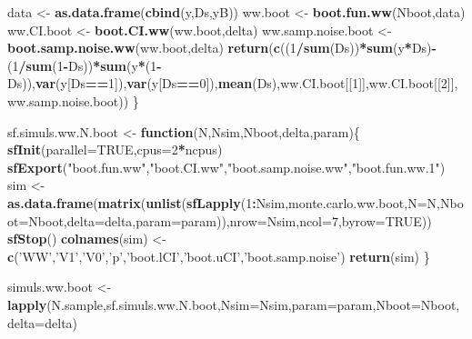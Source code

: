 \documentclass[]{book}
\newenvironment{Shaded}{\begin{snugshade}}{\end{snugshade}}
\newcommand{\ControlFlowTok}[1]{\textcolor[rgb]{0.13,0.29,0.53}{\textbf{#1}}}
\newcommand{\DataTypeTok}[1]{\textcolor[rgb]{0.13,0.29,0.53}{#1}}
\newcommand{\DecValTok}[1]{\textcolor[rgb]{0.00,0.00,0.81}{#1}}
\newcommand{\KeywordTok}[1]{\textcolor[rgb]{0.13,0.29,0.53}{\textbf{#1}}}
\newcommand{\NormalTok}[1]{#1}
\newcommand{\OperatorTok}[1]{\textcolor[rgb]{0.81,0.36,0.00}{\textbf{#1}}}
\newcommand{\OtherTok}[1]{\textcolor[rgb]{0.56,0.35,0.01}{#1}}
\newcommand{\StringTok}[1]{\textcolor[rgb]{0.31,0.60,0.02}{#1}}
\theoremstyle{definition}
\theoremstyle{definition}
\theoremstyle{definition}
\theoremstyle{remark}
\begin{document}
\begin{Shaded}
\begin{Highlighting}[]
\NormalTok{  data <-}\StringTok{ }\KeywordTok{as.data.frame}\NormalTok{(}\KeywordTok{cbind}\NormalTok{(y,Ds,yB))}
\NormalTok{  ww.boot <-}\StringTok{ }\KeywordTok{boot.fun.ww}\NormalTok{(Nboot,data)}
\NormalTok{  ww.CI.boot <-}\StringTok{ }\KeywordTok{boot.CI.ww}\NormalTok{(ww.boot,delta)}
\NormalTok{  ww.samp.noise.boot <-}\StringTok{ }\KeywordTok{boot.samp.noise.ww}\NormalTok{(ww.boot,delta)}
  \KeywordTok{return}\NormalTok{(}\KeywordTok{c}\NormalTok{((}\DecValTok{1}\OperatorTok{/}\KeywordTok{sum}\NormalTok{(Ds))}\OperatorTok{*}\KeywordTok{sum}\NormalTok{(y}\OperatorTok{*}\NormalTok{Ds)}\OperatorTok{-}\NormalTok{(}\DecValTok{1}\OperatorTok{/}\KeywordTok{sum}\NormalTok{(}\DecValTok{1}\OperatorTok{-}\NormalTok{Ds))}\OperatorTok{*}\KeywordTok{sum}\NormalTok{(y}\OperatorTok{*}\NormalTok{(}\DecValTok{1}\OperatorTok{-}\NormalTok{Ds)),}\KeywordTok{var}\NormalTok{(y[Ds}\OperatorTok{==}\DecValTok{1}\NormalTok{]),}\KeywordTok{var}\NormalTok{(y[Ds}\OperatorTok{==}\DecValTok{0}\NormalTok{]),}\KeywordTok{mean}\NormalTok{(Ds),ww.CI.boot[[}\DecValTok{1}\NormalTok{]],ww.CI.boot[[}\DecValTok{2}\NormalTok{]],ww.samp.noise.boot))}
\NormalTok{\}}

\NormalTok{sf.simuls.ww.N.boot <-}\StringTok{ }\ControlFlowTok{function}\NormalTok{(N,Nsim,Nboot,delta,param)\{}
  \KeywordTok{sfInit}\NormalTok{(}\DataTypeTok{parallel=}\OtherTok{TRUE}\NormalTok{,}\DataTypeTok{cpus=}\DecValTok{2}\OperatorTok{*}\NormalTok{ncpus)}
  \KeywordTok{sfExport}\NormalTok{(}\StringTok{"boot.fun.ww"}\NormalTok{,}\StringTok{"boot.CI.ww"}\NormalTok{,}\StringTok{"boot.samp.noise.ww"}\NormalTok{,}\StringTok{"boot.fun.ww.1"}\NormalTok{)}
\NormalTok{  sim <-}\StringTok{ }\KeywordTok{as.data.frame}\NormalTok{(}\KeywordTok{matrix}\NormalTok{(}\KeywordTok{unlist}\NormalTok{(}\KeywordTok{sfLapply}\NormalTok{(}\DecValTok{1}\OperatorTok{:}\NormalTok{Nsim,monte.carlo.ww.boot,}\DataTypeTok{N=}\NormalTok{N,}\DataTypeTok{Nboot=}\NormalTok{Nboot,}\DataTypeTok{delta=}\NormalTok{delta,}\DataTypeTok{param=}\NormalTok{param)),}\DataTypeTok{nrow=}\NormalTok{Nsim,}\DataTypeTok{ncol=}\DecValTok{7}\NormalTok{,}\DataTypeTok{byrow=}\OtherTok{TRUE}\NormalTok{))}
  \KeywordTok{sfStop}\NormalTok{()}
  \KeywordTok{colnames}\NormalTok{(sim) <-}\StringTok{ }\KeywordTok{c}\NormalTok{(}\StringTok{'WW'}\NormalTok{,}\StringTok{'V1'}\NormalTok{,}\StringTok{'V0'}\NormalTok{,}\StringTok{'p'}\NormalTok{,}\StringTok{'boot.lCI'}\NormalTok{,}\StringTok{'boot.uCI'}\NormalTok{,}\StringTok{'boot.samp.noise'}\NormalTok{)}
  \KeywordTok{return}\NormalTok{(sim)}
\NormalTok{\}}

\NormalTok{simuls.ww.boot <-}\StringTok{ }\KeywordTok{lapply}\NormalTok{(N.sample,sf.simuls.ww.N.boot,}\DataTypeTok{Nsim=}\NormalTok{Nsim,}\DataTypeTok{param=}\NormalTok{param,}\DataTypeTok{Nboot=}\NormalTok{Nboot,}\DataTypeTok{delta=}\NormalTok{delta)}
\end{Highlighting}
\end{Shaded}
\end{document}

